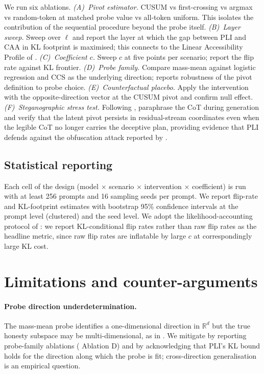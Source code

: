 \documentclass[11pt]{article}
\theoremstyle{definition}
\newcommand{\R}{\mathbb{R}}
\newcommand{\1}{\mathbf{1}}
\begin{document}
We run six ablations.
\emph{(A)~Pivot estimator.} CUSUM vs first-crossing vs argmax vs random-token at matched probe value vs all-token uniform. This isolates the contribution of the sequential procedure beyond the probe itself.
\emph{(B)~Layer sweep.} Sweep over $\ell$ and report the layer at which the gap between PLI and CAA in KL footprint is maximised; this connects to the Linear Accessibility Profile of \citet{billa2026lap}.
\emph{(C)~Coefficient $c$.} Sweep $c$ at five points per scenario; report the flip rate against KL frontier.
\emph{(D)~Probe family.} Compare mass-mean against logistic regression and CCS \citep{burns2022ccs} as the underlying direction; reports robustness of the pivot definition to probe choice.
\emph{(E)~Counterfactual placebo.} Apply the intervention with the opposite-direction vector at the CUSUM pivot and confirm null effect.
\emph{(F)~Steganographic stress test.} Following \citet{roger2023preventing}, paraphrase the CoT during generation and verify that the latent pivot persists in residual-stream coordinates even when the legible CoT no longer carries the deceptive plan, providing evidence that PLI defends against the obfuscation attack reported by \citet{baker2025monitoring}.

\subsection{Statistical reporting}

Each cell of the design (model $\times$ scenario $\times$ intervention $\times$ coefficient) is run with at least 256 prompts and 16 sampling seeds per prompt. We report flip-rate and KL-footprint estimates with bootstrap 95\% confidence intervals at the prompt level (clustered) and the seed level. We adopt the likelihood-accounting protocol of \citet{pres2024reliable}: we report KL-conditional flip rates rather than raw flip rates as the headline metric, since raw flip rates are inflatable by large $c$ at correspondingly large KL cost.

\section{Limitations and counter-arguments}
\label{sec:limits}

\paragraph{Probe direction underdetermination.} The mass-mean probe identifies a one-dimensional direction in $\R^d$ but the true honesty subspace may be multi-dimensional, as in \citet{burger2024universal}. We mitigate by reporting probe-family ablations ( Ablation D) and by acknowledging that PLI's KL bound holds for the direction along which the probe is fit; cross-direction generalisation is an empirical question.
\end{document}
